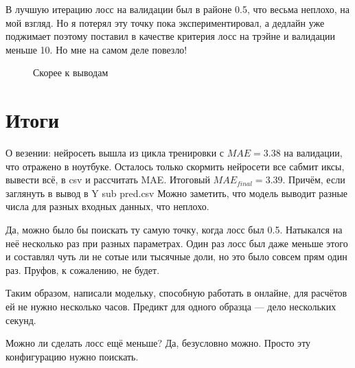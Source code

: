 \documentclass[12pt,a4paper]{report}
\begin{document}
В лучшую итерацию лосс на валидации был в районе 0.5, что весьма неплохо, на мой взгляд. Но я потерял эту точку пока экспериментировал, а дедлайн уже поджимает поэтому поставил в качестве критерия лосс на трэйне и валидации меньше 10. Но мне на самом деле повезло!
\begin{figure}[h!]
	\caption{Скорее к выводам}
	\label{fig:jump}
\end{figure}

\section*{Итоги}
О везении: нейросеть вышла из цикла тренировки с $MAE = 3.38$ на валидации, что отражено в ноутбуке. Осталось только скормить нейросети все сабмит иксы, вывести всё, в csv и рассчитать MAE. Итоговый $MAE_{final} = 3.39$. Причём, если заглянуть в вывод в Y sub pred.csv Можно заметить, что модель выводит разные числа для разных входных данных, что неплохо.

Да, можно было бы поискать ту самую точку, когда лосс был 0.5. Натыкался на неё несколько раз при разных параметрах. Один раз лосс был даже меньше этого и составлял чуть ли не сотые или тысячные доли, но это было совсем прям один раз. Пруфов, к сожалению, не будет.

Таким образом, написали модельку, способную работать в онлайне, для расчётов ей не нужно несколько часов. Предикт для одного образца — дело нескольких секунд.

Можно ли сделать лосс ещё меньше? Да, безусловно можно. Просто эту конфигурацию нужно поискать.
\end{document}
